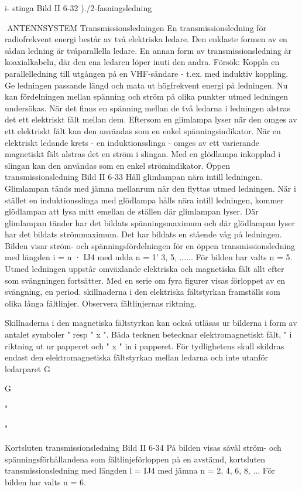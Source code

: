 {i- stinga
Bild II 6-32 )./2-fasningsledning

ANTENNSYSTEM
Transmissionsledningen
En transmissionsledning för radiofrekvent energi består av två elektriska ledare.
Den enklaste formen av en sådan ledning är
tvåparallella ledare. En annan form av transmissionsledning är koaxialkabeln, där den
ena ledaren löper inuti den andra.
Försök: Koppla en parallelledning till utgången på en VHF-sändare - t.ex. med
induktiv koppling. Ge ledningen passande
längd och mata ut högfrekvent energi på
ledningen. Nu kan fördelningen mellan spänning och ström på olika punkter utmed ledningen undersökas. När det finns en spänning mellan de två ledarna i ledningen alstras det ett elektriskt fält mellan dem.
Eftersom en glimlampa lyser när den
omges av ett elektriskt fält kan den användas som en enkel spänningsindikator.
När en elektriskt ledande krets - en induktionsslinga - omges av ett varierande
magnetiskt fält alstras det en ström i slingan.
Med en glödlampa inkopplad i slingan kan
den användas som en enkel strömindikator.
Öppen transmissionsledning
Bild II 6-33
Håll glimlampan nära intill ledningen.
Glimlampan tänds med jämna mellanrum
när den flyttas utmed ledningen.
När i stället en induktionsslinga med glödlampa hålls nära intill ledningen, kommer
glödlampan att lysa mitt emellan de ställen
där glimlampan lyser. Där glimlampan tänder har det bildats spänningsmaximum och
där glödlampan lyser har det bildats strömmaximum. Det har bildats en stående våg
på ledningen.
Bilden visar ström- och spänningsfördelningen för en öppen transmissionsledning med längden i = n · IJ4 med udda n =
1' 3, 5, ......
För bilden har valts n = 5.
Utmed ledningen uppstår omväxlande
elektriska och magnetiska fält allt efter som
svängningen fortsätter. Med en serie om
fyra figurer visas förloppet av en svängning,
en period. skillnaderna i den elektriska fältstyrkan framställs som olika långa fältlinjer.
Observera fältlinjernas riktning.

Skillnaderna i den magnetiska fältstyrkan
kan också utläsas ur bilderna i form av
antalet symboler "
resp " x ". Båda
tecknen betecknar elektromagnetiskt fält, "
i riktning ut ur papperet och " x " in i
papperet. För tydlighetens skull skildras
endast den elektromagnetiska fältstyrkan
mellan ledarna och inte utanför ledarparet
G

G

"

"

Kortsluten transmissionsledning
Bild II 6-34
På bilden visas såväl ström- och spänningsförhållandena som fältlinjeförloppen
på en avstämd, kortsluten transmissionsledning med längden l = IJ4 med jämna n =
2, 4, 6, 8, ... För bilden har valts n = 6.

}
